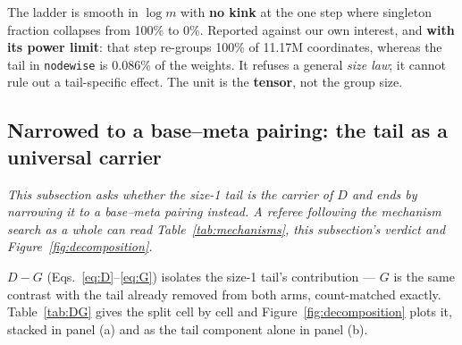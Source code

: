 \documentclass[10pt,letterpaper]{article}
\newcommand{\Dstat}{D}                         %
\newcommand{\Gstat}{G}                         %
\newcommand{\arm}[1]{\texttt{#1}}
\begin{document}
The ladder is smooth in $\log m$ with \textbf{no kink} at the one step where singleton fraction
collapses from 100\% to 0\%. Reported against our own interest, and \textbf{with its power
limit}: that step re-groups 100\% of 11.17M coordinates, whereas the tail in \arm{nodewise} is
0.086\% of the weights. It refuses a general \emph{size law}; it cannot rule out a tail-specific
effect. The unit is the \textbf{tensor}, not the group size.

\subsection{Narrowed to a base--meta pairing: the tail as a universal carrier}
\label{sec:tail}

\emph{This subsection asks whether the size-1 tail is the carrier of $\Dstat$ and ends by
narrowing it to a base--meta pairing instead. A referee following the mechanism search as a whole
can read Table~\ref{tab:mechanisms}, this subsection's verdict and
Figure~\ref{fig:decomposition}.}

$\Dstat - \Gstat$ (Eqs.~\ref{eq:D}--\ref{eq:G}) isolates the size-1 tail's contribution ---
$\Gstat$ is the same contrast with the tail already removed from both arms, count-matched
exactly. Table~\ref{tab:DG} gives the split cell by cell and Figure~\ref{fig:decomposition} plots
it, stacked in panel (a) and as the tail component alone in panel (b).
\end{document}
